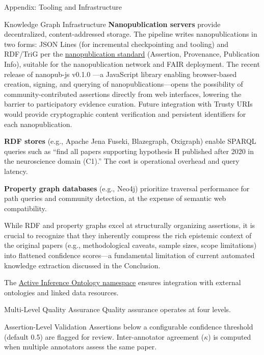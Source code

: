 \documentclass[
  ignorenonframetext,
]{beamer}
\begin{document}
\begin{frame}[fragile]{Appendix: Tooling and Infrastructure
\label{sec:tooling}}
\begin{block}{Knowledge Graph Infrastructure}
\textbf{Nanopublication servers} provide decentralized,
content-addressed storage. The pipeline writes nanopublications in two
forms: JSON Lines (for incremental checkpointing and tooling) and
RDF/TriG per the \href{https://nanopub.net/}{nanopublication standard}
(Assertion, Provenance, Publication Info), suitable for the
nanopublication network and FAIR deployment. The recent release of
nanopub-js v0.1.0 \citep{kuhn2026nanopubjs}---a JavaScript library
enabling browser-based creation, signing, and querying of
nanopublications---opens the possibility of community-contributed
assertions directly from web interfaces, lowering the barrier to
participatory evidence curation. Future integration with Trusty URIs
\citep{kuhn2014trusty} would provide cryptographic content verification
and persistent identifiers for each nanopublication.

\textbf{RDF stores} (e.g., Apache Jena Fuseki, Blazegraph, Oxigraph)
enable SPARQL queries such as ``find all papers supporting hypothesis H
published after 2020 in the neuroscience domain (C1).'' The cost is
operational overhead and query latency.

\textbf{Property graph databases} (e.g., Neo4j) prioritize traversal
performance for path queries and community detection, at the expense of
semantic web compatibility.

While RDF and property graphs excel at structurally organizing
assertions, it is crucial to recognize that they inherently compress the
rich epistemic context of the original papers (e.g., methodological
caveats, sample sizes, scope limitations) into flattened confidence
scores---a fundamental limitation of current automated knowledge
extraction discussed in the Conclusion.

The \href{http://activeinference.institute/ontology/}{Active Inference
Ontology namespace} ensures integration with external ontologies and
linked data resources.
\end{block}

\begin{block}{Multi-Level Quality Assurance}
\protect{}\label{multi-level-quality-assurance}
Quality assurance operates at four levels.

\begin{block}{Assertion-Level Validation}
\protect{}\label{assertion-level-validation}
Assertions below a configurable confidence threshold (default 0.5) are
flagged for review. Inter-annotator agreement (\(\kappa\)) is computed
when multiple annotators assess the same paper.
\end{block}


\end{block}
\end{frame}
\end{document}

